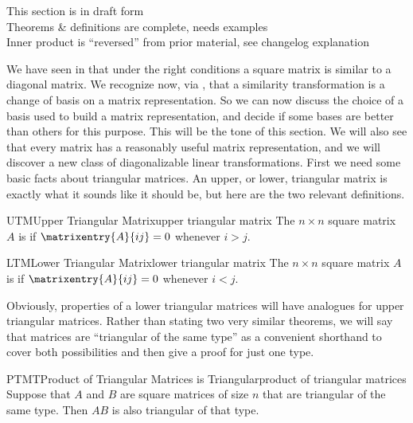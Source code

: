 %
{\sc\large This section is in draft form}\\
{\sc\large Theorems \& definitions are complete, needs examples}\\
{\sc\large Inner product is ``reversed'' from prior material, see changelog explanation}
\par\medskip
%
%
We have seen in  that under the right conditions a square matrix is similar to a diagonal matrix.  We recognize now, via , that a similarity transformation is a change of basis on a matrix representation.  So we can now discuss the choice of a basis used to build a matrix representation, and decide if some bases are better than others for this purpose.  This will be the tone of this section.  We will also see that every matrix has a reasonably useful matrix representation, and we will discover a new class of diagonalizable linear transformations.  First we need some basic facts about triangular matrices.
%
%
An upper, or lower, triangular matrix is exactly what it sounds like it should be, but here are the two relevant definitions.
%
\begin{definition}{UTM}{Upper Triangular Matrix}{upper triangular matrix}
The $n\times n$ square matrix $A$ is  if $\matrixentry{A}{ij} =0$ whenever $i>j$.
\end{definition}
%
%
\begin{definition}{LTM}{Lower Triangular Matrix}{lower triangular matrix}
The $n\times n$ square matrix $A$ is  if $\matrixentry{A}{ij} =0$ whenever $i<j$.
\end{definition}
%
Obviously, properties of a lower triangular matrices will have analogues for upper triangular matrices.  Rather than stating two very similar theorems, we will say that matrices are ``triangular of the same type'' as a convenient shorthand to cover both possibilities and then give a proof for just one type.
%
\begin{theorem}{PTMT}{Product of Triangular Matrices is Triangular}{product of triangular matrices}
Suppose that $A$ and $B$ are square matrices of size $n$ that are triangular of the same type.  Then $AB$ is also triangular of that type.
\end{theorem}

